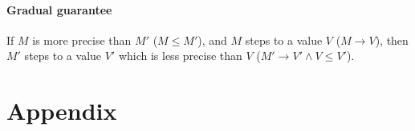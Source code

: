 \documentclass[\ClassReview acmsmall,screen,prologue,dvipsnames,style=authoryear,anonymous]{acmart}
\begin{document}
\paragraph{Gradual guarantee} If $M$ is more precise than $M'$ ($M \le M'$),
and $M$ steps to a value $V$ ($M \to V$), then $M'$ steps to a value $V'$ which
is less precise than $V$ ($M' \to V' \wedge V \le V'$).


% 
% 
% 
% 
% 
% 
% 

\appendix
\section{Appendix}
\label{sec:appendix}

%


\end{document}
